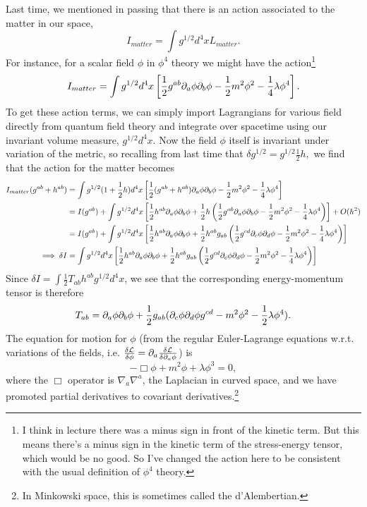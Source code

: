 Last time, we mentioned in passing that there is an action associated to the matter in our space,
$$I_{matter}=\int g^{1/2} d^4x L_{matter}.$$
For instance, for a scalar field $\phi$ in $\phi^4$ theory we might have the action\footnote{I think in lecture there was a minus sign in front of the kinetic term. But this means there's a minus sign in the kinetic term of the stress-energy tensor, which would be no good. So I've changed the action here to be consistent with the usual definition of $\phi^4$ theory.}
$$I_{matter}=\int g^{1/2} d^4x \left[\frac{1}{2}g^{ab}\partial_a \phi \partial_b \phi -\frac{1}{2}m^2\phi^2-\frac{1}{4} \lambda \phi^4\right].$$
To get these action terms, we can simply import Lagrangians for various field directly from quantum field theory and integrate over spacetime using our invariant volume measure, $g^{1/2}d^4x$. Now the field $\phi$ itself is invariant under variation of the metric, so recalling from last time that $\delta g^{1/2}=g^{1/2}\frac{1}{2}h,$ we find that the action for the matter becomes
\begin{align*}
    I_{matter}(g^{ab}+h^{ab})&= \int g^{1/2}(1+\frac{1}{2}h) d^4x \left[\frac{1}{2}(g^{ab}+h^{ab})\partial_a \phi \partial_b \phi -\frac{1}{2}m^2\phi^2-\frac{1}{4} \lambda \phi^4\right]\\
    &=I(g^{ab})+\int g^{1/2} d^4x \left[\frac{1}{2} h^{ab} \partial_a \phi\partial_b \phi+\frac{1}{2}h\left(\frac{1}{2}g^{ab}\partial_a \phi \partial_b \phi -\frac{1}{2}m^2\phi^2-\frac{1}{4} \lambda \phi^4\right)\right]+O(h^2)\\
    &=I(g^{ab})+\int g^{1/2} d^4x \left[\frac{1}{2} h^{ab} \partial_a \phi\partial_b \phi+\frac{1}{2}h^{ab}g_{ab}\left(\frac{1}{2}g^{cd}\partial_c \phi \partial_d \phi -\frac{1}{2}m^2\phi^2-\frac{1}{4} \lambda \phi^4\right)\right]\\
    \implies \delta I &=\int g^{1/2} d^4x \left[\frac{1}{2} h^{ab}\partial_a \phi \partial_b \phi +\frac{1}{2} h^{ab}g_{ab}\left(\frac{1}{2} g^{cd} \partial_c \phi \partial_d \phi -\frac{1}{2} m^2 \phi^2 -\frac{1}{4} \lambda \phi^4\right)\right]
\end{align*}
Since $\delta I= \int \frac{1}{2} T_{ab} h^{ab} g^{1/2} d^4x$, we see that the corresponding energy-momentum tensor is therefore
$$T_{ab}=\partial_a \phi \partial_b \phi +\frac{1}{2} g_{ab}(\partial_c \phi \partial_d \phi g^{cd} -m^2\phi^2 -\frac{1}{2} \lambda \phi^4).$$
The equation for motion for $\phi$ (from the regular Euler-Lagrange equations w.r.t. variations of the fields, i.e. $\frac{\delta \mathcal L}{\delta \phi}=\partial_a \frac{\delta \mathcal L}{\delta \partial_a \phi}$) is
$$-\Box \phi+ m^2\phi +\lambda \phi^3 =0,$$
where the $\Box$ operator is $\nabla_a \nabla^a$, the Laplacian in curved space, and we have promoted partial derivatives to covariant derivatives.\footnote{In Minkowski space, this is sometimes called the d'Alembertian.}

